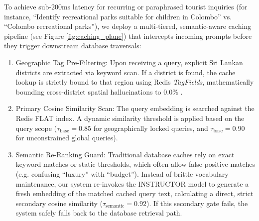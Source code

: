 \documentclass{ieeeaccess}
\begin{document}
To achieve sub-200ms latency for recurring or paraphrased tourist inquiries (for instance, ``Identify recreational parks suitable for children in Colombo'' vs. ``Colombo recreational parks''), we deploy a multi-tiered, semantic-aware caching pipeline (see Figure \ref{fig:caching_plane}) that intercepts incoming prompts before they trigger downstream database traversals:
\begin{enumerate}
    \item Geographic Tag Pre-Filtering: Upon receiving a query, explicit Sri Lankan districts are extracted via keyword scan. If a district is found, the cache lookup is strictly bound to that region using Redis \emph{TagFields}, mathematically bounding cross-district spatial hallucinations to 0.0\% \cite{bang-gptcache-2023}.
    \item Primary Cosine Similarity Scan: The query embedding is searched against the Redis FLAT index. A dynamic similarity threshold is applied based on the query scope ($\tau_{\text{base}} = 0.85$ for geographically locked queries, and $\tau_{\text{base}} = 0.90$ for unconstrained global queries).
    \item Semantic Re-Ranking Guard: Traditional database caches rely on exact keyword matches or static thresholds, which often allow false-positive matches (e.g. confusing ``luxury'' with ``budget''). Instead of brittle vocabulary maintenance, our system re-invokes the INSTRUCTOR model to generate a fresh embedding of the matched cached query text, calculating a direct, strict secondary cosine similarity ($\tau_{\text{semantic}} = 0.92$). If this secondary gate fails, the system safely falls back to the database retrieval path.
\end{enumerate}
\end{document}
